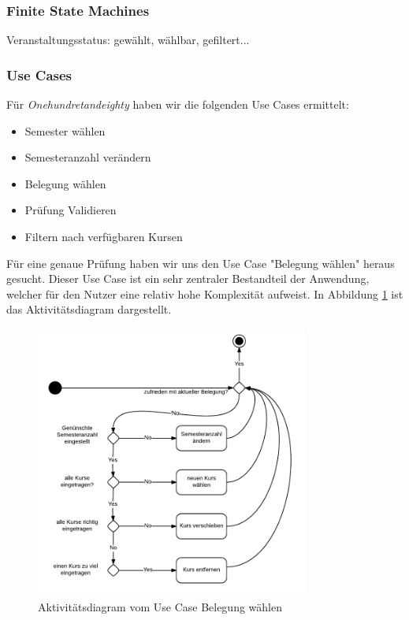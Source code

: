 \documentclass[ngerman]{article}
\begin{document}
\subsubsection{Finite State Machines}
Veranstaltungsstatus: gewählt, wählbar, gefiltert...


\subsubsection{Use Cases}
Für \emph{Onehundretandeighty} haben wir die folgenden Use Cases ermittelt:

\begin{itemize}
    \item Semester wählen
    \item Semesteranzahl verändern
    \item Belegung wählen
    \item Prüfung Validieren
    \item Filtern nach verfügbaren Kursen
\end{itemize}

Für eine genaue Prüfung haben wir uns den Use Case "Belegung wählen" heraus gesucht. Dieser Use Case ist ein sehr zentraler Bestandteil der Anwendung, welcher für den Nutzer eine relativ hohe Komplexität aufweist. In Abbildung \ref{fig:graph_belegung_waehlen} ist das Aktivitätsdiagram dargestellt.

\begin{figure}
\includegraphics[width=0.8\textwidth]{figures/180_Belegungaendern_aktivitaet.pdf}
\caption{Aktivitätsdiagram vom Use Case Belegung wählen}
\label{fig:graph_belegung_waehlen}
\end{figure}
\end{document}

